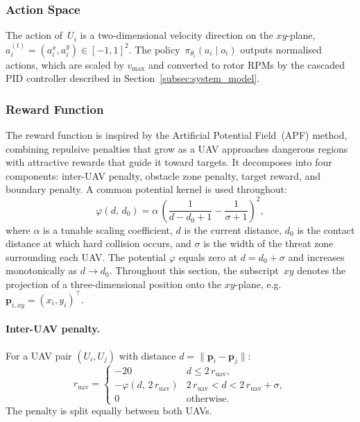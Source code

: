 \subsubsection{Action Space}
\label{subsubsec:action}

The action of~$U_i$ is a two-dimensional velocity direction on the $xy$-plane,
$a_i^{(t)} = (a_i^{x}, a_i^{y}) \in [-1,1]^{2}$.
The policy~$\pi_{\theta_i}(a_i \mid o_i)$ outputs normalised actions, which are
scaled by $v_{\max}$ and converted to rotor RPMs by the cascaded PID controller
described in Section~\ref{subsec:system_model}.

\subsubsection{Reward Function}
\label{subsubsec:reward}

The reward function is inspired by the Artificial Potential Field~(APF) method,
combining repulsive penalties that grow as a UAV approaches dangerous regions
with attractive rewards that guide it toward targets.
It decomposes into four components: inter-UAV penalty, obstacle zone penalty,
target reward, and boundary penalty.
A common potential kernel is used throughout:
\begin{equation}
  \varphi(d,\,d_0) =
    \alpha\,
    \left(
      \frac{1}{d - d_0 + 1}
      - \frac{1}{\sigma + 1}
    \right)^{\!2},
  \label{eq:apf_kernel}
\end{equation}
where $\alpha$ is a tunable scaling coefficient, $d$ is the current distance,
$d_0$ is the contact distance at which hard collision occurs, and
$\sigma$ is the width of the threat zone surrounding each UAV.
The potential $\varphi$ equals zero at $d = d_0 + \sigma$ and increases
monotonically as $d \to d_0$.
Throughout this section, the subscript~$xy$ denotes the projection of a
three-dimensional position onto the $xy$-plane, e.g.\
$\mathbf{p}_{i,xy} = (x_i, y_i)^{\top}$.

\paragraph{Inter-UAV penalty.}
For a UAV pair $(U_i, U_j)$ with distance
$d = \lVert\mathbf{p}_i - \mathbf{p}_j\rVert$:
\begin{equation}
  r_{\mathrm{uav}} =
  \begin{cases}
    -20 & d \le 2\,r_{\mathrm{uav}}, \\[3pt]
    -\varphi(d,\, 2\,r_{\mathrm{uav}})
    & 2\,r_{\mathrm{uav}} < d < 2\,r_{\mathrm{uav}} + \sigma, \\[3pt]
    0 & \text{otherwise}.
  \end{cases}
  \label{eq:r_uav}
\end{equation}
The penalty is split equally between both UAVs.

